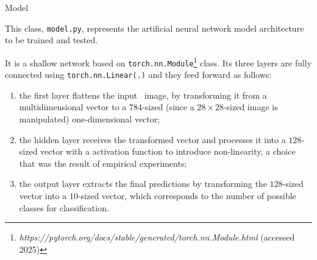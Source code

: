 \begin{section}{Model}
    \par This class, \texttt{model.py}, represents the artificial neural network model architecture to be trained and tested.
    \par It is a shallow network based on \texttt{torch.nn.Module}\footnote{\textit{https://pytorch.org/docs/stable/generated/torch.nn.Module.html} (accessed 2025)} class. Its three layers are fully connected using \texttt{torch.nn.Linear(.)} and they feed forward as follows:
    \begin{enumerate}
        \item the first layer flattens the input~ image, by transforming it from a multidimensional vector to a $784$-sized (since a $28 \times 28$-sized image is manipulated) one-dimensional vector;
        \item the hidden layer receives the transformed vector and processes it into a $128$-sized vector with a  activation function to introduce non-linearity, a choice that was the result of empirical experiments;
        \item the output layer extracts the final predictions by transforming the $128$-sized vector into a $10$-sized vector, which corresponds to the number of possible classes for classification.
    \end{enumerate}
\end{section}
\clearpage